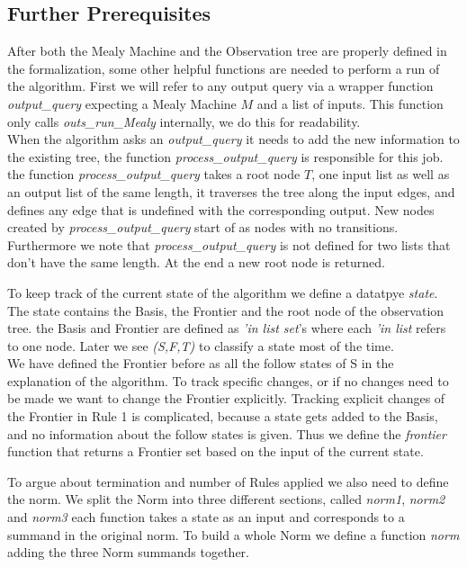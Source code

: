 \subsection{Further Prerequisites}
After both the Mealy Machine and the Observation tree are properly defined in the formalization, some other helpful functions are needed to perform a run of the algorithm. First we will refer to any output query via a wrapper function \textit{output\_query} expecting a Mealy Machine $M$ and a list of inputs. This function only calls \textit{outs\_run\_Mealy} internally, we do this for readability. \\
When the algorithm asks an \textit{output\_query} it needs to add the new information to the existing tree, the function \textit{process\_output\_query} is responsible for this job. the function \textit{process\_output\_query} takes a root node $T$, one input list as well as an output list of the same length, it traverses the tree along the input edges, and defines any edge that is undefined with the corresponding output. New nodes created by \textit{process\_output\_query} start of as nodes with no transitions. Furthermore we note that \textit{process\_output\_query} is not defined for two lists that don't have the same length. At the end a new root node is returned. 
\begin{myisabelle}
	\procopquery
\end{myisabelle}
To keep track of the current state of the algorithm we define a datatpye \textit{state}. The state contains the Basis, the Frontier and the root node of the observation tree. the Basis and Frontier are defined as \textit{'in list set}'s where each \textit{'in list} refers to one node. Later we see \textit{(S,F,T)} to classify a state most of the time.\\
We have defined the Frontier before as all the follow states of S in the explanation of the algorithm. To track specific changes, or if no changes need to be made we want to change the Frontier explicitly. Tracking explicit changes of the Frontier in Rule 1 is complicated, because a state gets added to the Basis, and no information about the follow states is given. Thus we define the \textit{frontier} function that returns a Frontier set based on the input of the current state.
 \begin{myisabelle}
 	\frontier
 \end{myisabelle}
To argue about termination and number of Rules applied we also need to define the norm. We split the Norm into three different sections, called \textit{norm1}, \textit{norm2} and \textit{norm3} each function takes a state as an input and corresponds to a summand in the original norm. To build a whole Norm we define a function \textit{norm} adding the three Norm summands together.\\ 
